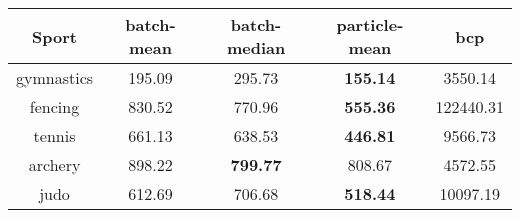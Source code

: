 \begin{tabular}{|c|c|c|c|c|}
\hline
Sport & batch-mean & batch-median & particle-mean & bcp \\
\hline
gymnastics & 195.09 & 295.73 & \textbf{155.14} & 3550.14 \\
fencing & 830.52 & 770.96 & \textbf{555.36} & 122440.31 \\
tennis & 661.13 & 638.53 & \textbf{446.81} & 9566.73 \\
archery & 898.22 & \textbf{799.77} & 808.67 & 4572.55 \\
judo & 612.69 & 706.68 & \textbf{518.44} & 10097.19 \\
\hline
\end{tabular}
